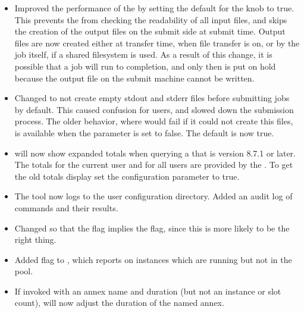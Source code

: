 \begin{itemize}

\item Improved the performance of the  by setting the
default for the knob  to true.  This prevents
the  from checking the readability of all input files, and skips
the creation of the output files on the submit side at submit time.
Output files are now created either at transfer time, when file transfer
is on, or by the job itself, if a shared filesystem is used.  As a result
of this change, it is possible that a job will run to completion, and only
then is put on hold because the output file on the submit machine cannot
be written.

\item Changed  to not create empty stdout and stderr files before
submitting jobs by default.  This caused confusion for users, and slowed down
the submission process.  The older behavior, where  would fail
if it could not create this files, is available when the parameter
 is set to false.  The default is now true.

\item {} will now show expanded totals when querying a  that is version 8.7.1 or later.
The totals for the current user and for all users are provided by the .
To get the old totals display set the configuration parameter  to true.

\item The  tool now logs to the user configuration directory.  Added an
audit log of  commands and their results.

\item Changed  so that the  flag implies the
 flag, since this is more likely to be the right thing.

\item Added  flag to , which reports on
instances which are running but not in the pool.

\item If invoked with an annex name and duration (but not an instance or slot
count),  will now adjust the duration of the named annex.


\end{itemize}
